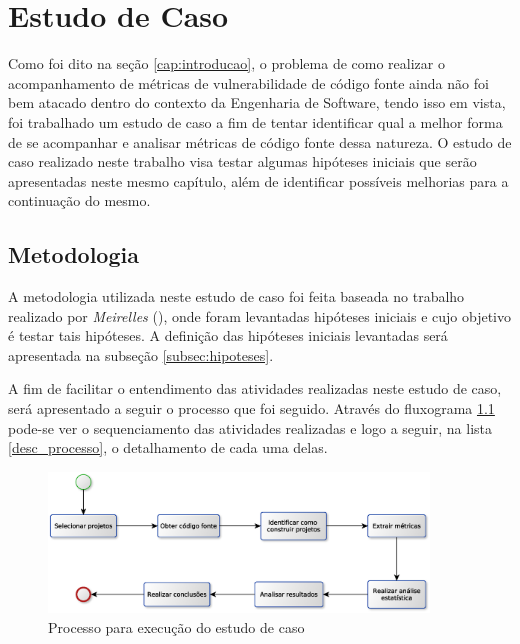 \chapter{Estudo de Caso} \label{estudodecaso}

Como foi dito na seção \ref{cap:introducao}, o problema de como realizar o
acompanhamento de métricas de vulnerabilidade de código fonte ainda não foi bem
atacado dentro do contexto da Engenharia de Software, tendo isso em vista,
foi trabalhado um estudo de caso a fim de tentar identificar qual a melhor forma
de se acompanhar e analisar métricas de código fonte dessa natureza. O estudo
de caso realizado neste trabalho visa testar algumas hipóteses iniciais que serão apresentadas
neste mesmo capítulo, além de identificar possíveis melhorias para a continuação
do mesmo.

\section{Metodologia} \label{sec:metodologia}

A metodologia utilizada neste estudo de caso foi feita baseada no trabalho
realizado por \emph{Meirelles} (\citeyear{meirelles2013}), onde foram levantadas
hipóteses iniciais e cujo objetivo é testar tais hipóteses. A definição das
hipóteses iniciais levantadas será apresentada na subseção \ref{subsec:hipoteses}.

A fim de facilitar o entendimento das atividades realizadas neste estudo de
caso, será apresentado a seguir o processo que foi seguido. Através do
fluxograma \ref{fig:processo_estudo_de_caso} pode-se ver o sequenciamento das
atividades realizadas e logo a seguir, na lista \ref{desc_processo}, o
detalhamento de cada uma delas.

\begin{figure}[h]
  \centering
  \includegraphics[width=0.9\textwidth]
      {figuras/estudo_de_caso_processo.eps}
  \caption{Processo para execução do estudo de caso}
  \label{fig:processo_estudo_de_caso}
\end{figure}


